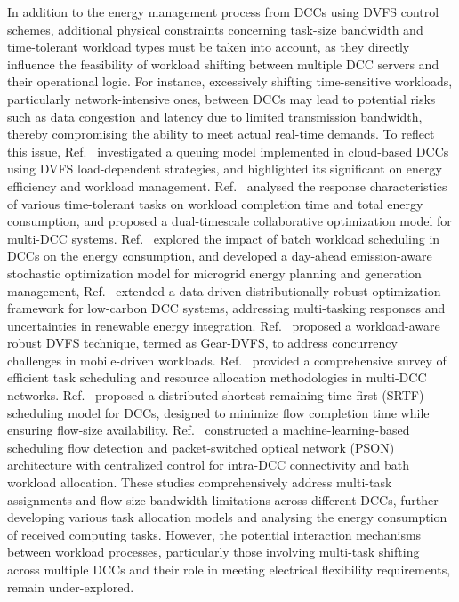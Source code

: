 \documentclass[lettersize,journal]{IEEEtran}
\begin{document}
In addition to the energy management process from DCCs using DVFS control schemes, additional physical constraints concerning task-size bandwidth and time-tolerant workload types must be taken into account, as they directly influence the feasibility of workload shifting between multiple DCC servers and their operational logic. For instance, excessively shifting time-sensitive workloads, particularly network-intensive ones, between DCCs may lead to potential risks such as data congestion and latency due to limited transmission bandwidth, thereby compromising the ability to meet actual real-time demands. To reflect this issue,
Ref.~\cite{kuehnDVFSpowerManagementPerformance2019} investigated a queuing model implemented in cloud-based DCCs using DVFS load-dependent strategies, and highlighted its significant on energy efficiency and workload management.
Ref.~\cite{hanDualtimeScaleCollaborative2025} analysed the response characteristics of various time-tolerant tasks on workload completion time and total energy consumption, and proposed a dual-timescale collaborative optimization model for multi-DCC systems.
Ref.~\cite{dingEmissionawareStochasticResource2018} explored the impact of batch workload scheduling in DCCs on the energy consumption, and  developed a day-ahead emission-aware stochastic optimization model for microgrid energy planning and generation management,
Ref.~\cite{hanDatadrivenDistributionallyRobust2025} extended a data-driven distributionally robust optimization framework for low-carbon DCC systems, addressing multi-tasking responses and uncertainties in renewable energy integration.
Ref.~\cite{lin2023workload} proposed a workload-aware robust DVFS technique, termed as Gear-DVFS, to address concurrency challenges in mobile-driven workloads.
Ref.~\cite{wangClusterFrameworksEfficient2018} provided a comprehensive survey of efficient task scheduling and resource allocation methodologies in multi-DCC networks.
Ref.~\cite{8520806} proposed a distributed shortest remaining time first (SRTF) scheduling model for DCCs, designed to minimize flow completion time while ensuring flow-size availability.
Ref.~\cite{wangSchedulingMachineLearningBasedFlow2018} constructed a machine-learning-based scheduling flow detection and packet-switched optical network (PSON) architecture with centralized control for intra-DCC connectivity and bath workload allocation.
These studies comprehensively address multi-task assignments and flow-size bandwidth limitations across different DCCs, further developing various task allocation models and analysing the energy consumption of received computing tasks. However, the potential interaction mechanisms between workload processes, particularly those involving multi-task shifting across multiple DCCs and their role in meeting electrical flexibility requirements, remain under-explored.
\end{document}
